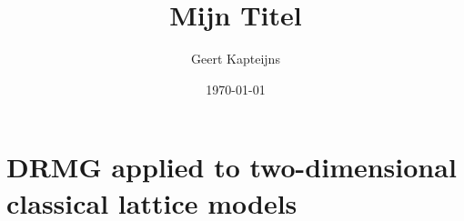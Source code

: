\documentclass[9pt, ebook, openany, oneside]{memoir}
\renewcommand{\afterchaptertitle}{%
 \vskip2em
 \hrule height 0.6pt
 \vskip2em
 }
\begin{document}
\pagestyle{simple}



\frontmatter

\title{Mijn Titel}
\author{Geert Kapteijns}
\date{\today}


\begingroup
\renewcommand{\afterchaptertitle}{\vskip1.5em}

\tableofcontents*
\endgroup

\mainmatter

% 
% 
\chapter{DRMG applied to two-dimensional classical lattice models}

%
% 
%

% 
% 
%
% 
% 
%
% 

% 



\backmatter
\printbibliography
\end{document}
